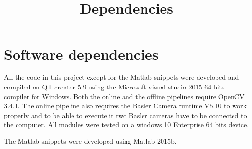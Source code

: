 \documentclass[]{article}
\title{Dependencies}
\author{}
\begin{document}
\maketitle


\section{Software dependencies}

All the code in this project except for the Matlab snippets were developed and compiled on QT creator 5.9 using the Microsoft visual studio 2015 64 bits compiler for Windows. Both the online and the offline pipelines require OpenCV 3.4.1. The online pipeline also requires the Basler Camera runtime V5.10 to work properly and to be able to execute it two Basler cameras have to be connected to the computer. All modules were tested on a windows 10 Enterprise 64 bits device.

The Matlab snippets were developed using Matlab 2015b.
\end{document}
